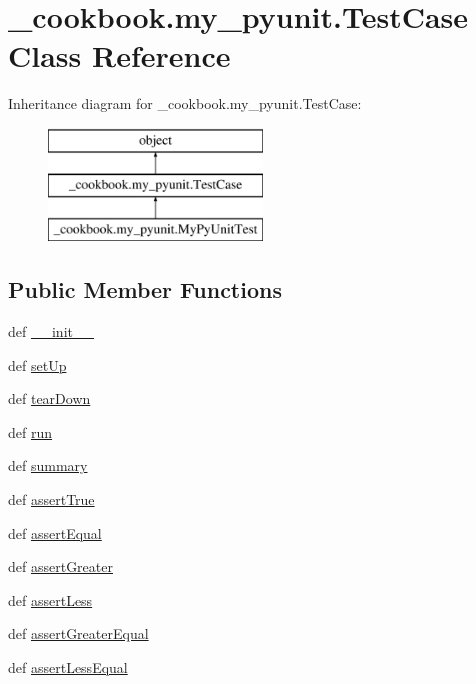 \hypertarget{class__cookbook_1_1my__pyunit_1_1TestCase}{\section{\-\_\-cookbook.\-my\-\_\-pyunit.\-Test\-Case Class Reference}
\label{class__cookbook_1_1my__pyunit_1_1TestCase}
}
Inheritance diagram for \-\_\-cookbook.\-my\-\_\-pyunit.\-Test\-Case\-:\begin{figure}[H]
\begin{center}
\leavevmode
\includegraphics[height=3.000000cm]{d5/d0e/class__cookbook_1_1my__pyunit_1_1TestCase}
\end{center}
\end{figure}
\subsection*{Public Member Functions}
\begin{DoxyCompactItemize}
\item 
def \hyperlink{class__cookbook_1_1my__pyunit_1_1TestCase_aba31c6c59f32b40e390fbeb4a00a4e87}{\-\_\-\-\_\-init\-\_\-\-\_\-}
\item 
def \hyperlink{class__cookbook_1_1my__pyunit_1_1TestCase_a9af9fafdc8f337109d08db63ebd18fd2}{set\-Up}
\item 
def \hyperlink{class__cookbook_1_1my__pyunit_1_1TestCase_ab77325c9f2ce70b345883d56c1f86872}{tear\-Down}
\item 
def \hyperlink{class__cookbook_1_1my__pyunit_1_1TestCase_af0e73c2611cd4bdcff403ef50befc044}{run}
\item 
def \hyperlink{class__cookbook_1_1my__pyunit_1_1TestCase_a12cc1032e4ad38c28767de95adcffd0e}{summary}
\item 
def \hyperlink{class__cookbook_1_1my__pyunit_1_1TestCase_a882b78923fece4ed2e93abdf28a759fc}{assert\-True}
\item 
def \hyperlink{class__cookbook_1_1my__pyunit_1_1TestCase_a9e0dcc921b9d184ea7ed32b729ff4362}{assert\-Equal}
\item 
def \hyperlink{class__cookbook_1_1my__pyunit_1_1TestCase_a1a6e6cfc473a84cf431cd262bce94c82}{assert\-Greater}
\item 
def \hyperlink{class__cookbook_1_1my__pyunit_1_1TestCase_a9542fc7ac24ec1e1c4163f135c753f84}{assert\-Less}
\item 
def \hyperlink{class__cookbook_1_1my__pyunit_1_1TestCase_ad3acee5c46f3b10f8d78125aa5e8c8b9}{assert\-Greater\-Equal}
\item 
def \hyperlink{class__cookbook_1_1my__pyunit_1_1TestCase_a91c192bb291d88a5b2a13df6da661217}{assert\-Less\-Equal}
\end{DoxyCompactItemize}
